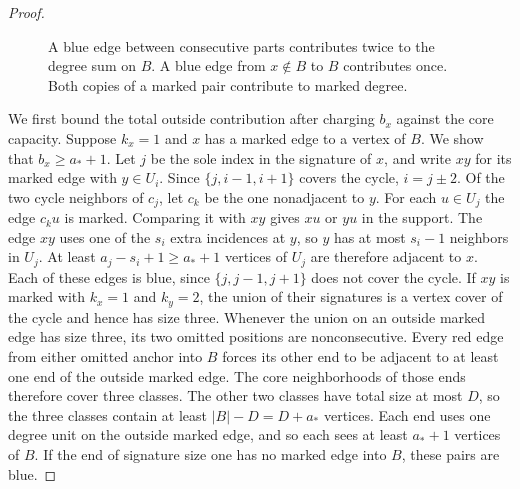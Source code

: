 \documentclass[preprint,11pt,numbers]{elsarticle-arxiv}
\numberwithin{equation}{section}
\theoremstyle{definition}
\begin{document}
\begin{proof}
\begin{figure}[htbp]
\centering
{}
\caption{A blue edge between consecutive parts contributes twice to
the degree sum on $B$. A blue edge from $x\notin B$ to $B$ contributes
once. Both copies of a marked pair contribute to marked degree.}
\label{fig:multigraph-cut}
\end{figure}

We first bound the total outside contribution after charging $b_x$ against
the core capacity. Suppose $k_x=1$ and $x$ has a marked edge to a vertex of $B$.
We show that $b_x\ge a_*+1$. Let $j$ be the sole index in the signature of $x$, and write $xy$ for
its marked edge with $y\in U_i$. Since $\{j,i-1,i+1\}$ covers the
cycle, $i=j\pm2$. Of the two cycle neighbors of $c_j$, let $c_k$
be the one nonadjacent to $y$. For each $u\in U_j$ the edge $c_ku$
is marked. Comparing it with $xy$ gives $xu$ or $yu$ in the support.
The edge $xy$ uses one of the $s_i$ extra incidences at $y$, so
$y$ has at most $s_i-1$ neighbors in $U_j$. At least
$a_j-s_i+1\ge a_*+1$ vertices of $U_j$ are therefore adjacent to
$x$. Each of these edges is blue, since $\{j,j-1,j+1\}$ does not
cover the cycle. If $xy$ is marked with $k_x=1$ and $k_y=2$, the union of their
signatures is a vertex cover of the cycle and hence has size three.
Whenever the union on an outside marked edge has size three, its two
omitted positions are nonconsecutive. Every red edge from either
omitted anchor into $B$ forces its other end to be adjacent to at least
one end of the outside marked edge. The core neighborhoods of those
ends therefore cover three classes. The other two classes have total
size at most $D$, so the three classes contain at least $|B|-D=D+a_*$
vertices. Each end uses one degree unit on the outside marked edge,
and so each sees at least $a_*+1$ vertices of $B$. If the end of
signature size one has no marked edge into $B$, these pairs are blue.


\end{proof}
\end{document}

